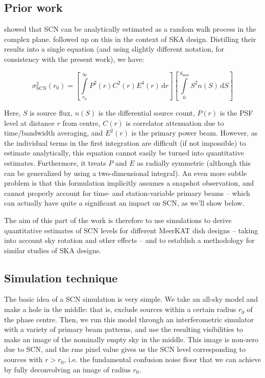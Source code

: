 \documentclass{aa}
\begin{document}
\subsection{Prior work}

\citet[][see Appendix B]{VLA146} showed that SCN can be analytically estimated as a random walk process in the complex plane. \citet[][]{SKA54-expa,SKA54} followed up on this in the context of SKA design. Distilling their results into a single equation (and using slightly different notation, for consistency with the present work), we have:

\newcommand{\DD}[1]{\,\mathrm{d}{#1}}

\begin{equation}
\label{eq:fscn}
  \sigma^2_\mathrm{SCN}(r_0) = \left [ \int\limits_{r_0}^{\infty} P^2(r)C^2(r)E^4(r) \DD{r} \right ]
\left[ \int\limits_{0}^{S_\mathrm{max}} S^2n(S)\DD{S}\right ] 
\end{equation}

Here, $S$ is source flux, $n(S)$ is the differential source count, $P(r)$ is the PSF level at distance $r$ from centre, $C(r)$ is correlator attenuation due to time/bandwidth averaging, and $E^2(r)$ is the primary power beam. However, as the individual terms in the first integration are difficult (if not impossible) to estimate analytically, this equation cannot easily be turned into quantitative estimates. Furthermore, it treats $P$ and $E$ as radially symmetric (although this can be generalized by using a two-dimensional integral). An even more subtle problem is that this formulation implicitly assumes a snapshot observation, and cannot properly account for time- and station-variable primary beams -- which can actually have quite a significant an impact on SCN, as we'll show below.

The aim of this part of the work is therefore to use simulations to derive quantitative estimates of SCN levels for different MeerKAT dish designs -- taking into account sky rotation and other effects -- and to establish a methodology for similar studies of SKA designs.

\subsection{Simulation technique}

The basic idea of a SCN simulation is very simple. We take an all-sky model and make a hole in the middle: that is, exclude sources within a certain radius $r_0$ of the phase centre. Then, we run this model through an interferometric simulator with a variety of primary beam patterns, and use the resulting visibilities to make an image of the nominally empty sky in the middle. This image is non-zero due to SCN, and the rms pixel value gives us the SCN level corresponding to sources with $r>r_0$, i.e. the fundamental confusion noise floor that we can achieve by fully deconvolving an image of radius $r_0$.
\end{document}
